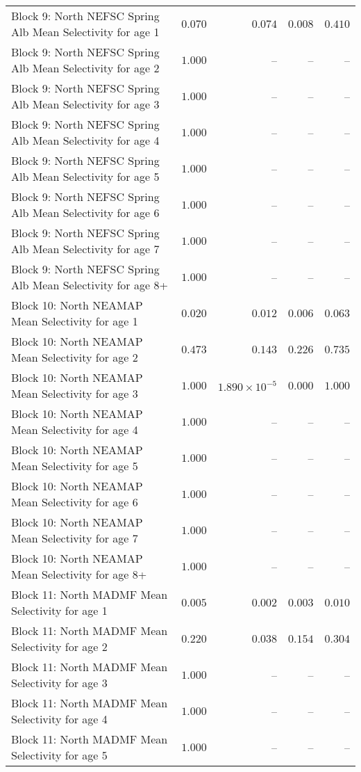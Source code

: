 \documentclass[
]{article}
\begin{document}
\begin{landscape}
\begin{longtable}[t]{lrrrr}
Block 9: North NEFSC Spring Alb Mean Selectivity for age 1 & $0.070$ & $0.074$ & $0.008$ & $0.410$\\
Block 9: North NEFSC Spring Alb Mean Selectivity for age 2 & $1.000$ & -- & -- & --\\
Block 9: North NEFSC Spring Alb Mean Selectivity for age 3 & $1.000$ & -- & -- & --\\
Block 9: North NEFSC Spring Alb Mean Selectivity for age 4 & $1.000$ & -- & -- & --\\
\addlinespace
Block 9: North NEFSC Spring Alb Mean Selectivity for age 5 & $1.000$ & -- & -- & --\\
Block 9: North NEFSC Spring Alb Mean Selectivity for age 6 & $1.000$ & -- & -- & --\\
Block 9: North NEFSC Spring Alb Mean Selectivity for age 7 & $1.000$ & -- & -- & --\\
Block 9: North NEFSC Spring Alb Mean Selectivity for age 8+ & $1.000$ & -- & -- & --\\
Block 10: North NEAMAP Mean Selectivity for age 1 & $0.020$ & $0.012$ & $0.006$ & $0.063$\\
\addlinespace
Block 10: North NEAMAP Mean Selectivity for age 2 & $0.473$ & $0.143$ & $0.226$ & $0.735$\\
Block 10: North NEAMAP Mean Selectivity for age 3 & $1.000$ & $1.890\times 10^{-5}$ & $0.000$ & $1.000$\\
Block 10: North NEAMAP Mean Selectivity for age 4 & $1.000$ & -- & -- & --\\
Block 10: North NEAMAP Mean Selectivity for age 5 & $1.000$ & -- & -- & --\\
Block 10: North NEAMAP Mean Selectivity for age 6 & $1.000$ & -- & -- & --\\
\addlinespace
Block 10: North NEAMAP Mean Selectivity for age 7 & $1.000$ & -- & -- & --\\
Block 10: North NEAMAP Mean Selectivity for age 8+ & $1.000$ & -- & -- & --\\
Block 11: North MADMF Mean Selectivity for age 1 & $0.005$ & $0.002$ & $0.003$ & $0.010$\\
Block 11: North MADMF Mean Selectivity for age 2 & $0.220$ & $0.038$ & $0.154$ & $0.304$\\
Block 11: North MADMF Mean Selectivity for age 3 & $1.000$ & -- & -- & --\\
\addlinespace
Block 11: North MADMF Mean Selectivity for age 4 & $1.000$ & -- & -- & --\\
Block 11: North MADMF Mean Selectivity for age 5 & $1.000$ & -- & -- & --\\

\end{longtable}
\end{landscape}
\end{document}
